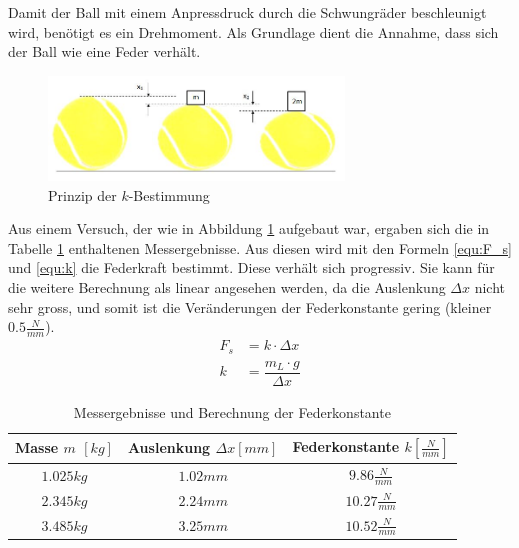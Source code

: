 Damit der Ball mit einem Anpressdruck durch die Schwungräder beschleunigt 
wird, benötigt es ein Drehmoment. Als Grundlage dient die Annahme, dass sich der 
Ball wie eine Feder verhält.

\begin{figure}[h!]
    \centering
    \includegraphics[width=0.7\textwidth]
    {Enddokumentation/Anhang/Bilder/KompressionBaelle.jpg}
    \caption{Prinzip der $k$-Bestimmung}
    \label{fig:BallKomp}
\end{figure}

Aus einem Versuch, der wie in Abbildung \ref{fig:BallKomp} aufgebaut war, ergaben sich die in Tabelle \ref{tab:BallKompErgebnis} enthaltenen Messergebnisse. Aus diesen wird mit den Formeln \ref{equ:F_s} und \ref{equ:k} die Federkraft bestimmt. Diese verhält sich progressiv. Sie kann für die weitere Berechnung als linear angesehen werden, da die Auslenkung $\Delta x$ nicht sehr gross, und somit ist die Veränderungen der Federkonstante gering (kleiner $0.5 \frac{N}{mm}$).
\begin{align}  
    F_s &= k \cdot \Delta x 
    \label{equ:F_s}\\
    k &= \dfrac{m_L \cdot g}{\Delta x}
    \label{equ:k}
\end{align}
\begin{table}[h!]
    \begin{tabular}{ccc}
        \rule{0pt}{11pt} Masse $m$ $\left[kg\right]$ & Auslenkung $\Delta x 
        \left[mm\right]$ & Federkonstante $k \left[\frac{N}{mm}\right]$\\
        \hline
        \rule{0pt}{11pt} $1.025 kg$ & $1.02 mm$ & $9.86  \frac{N}{mm}$\\
        \rule{0pt}{11pt} $2.345 kg$ & $2.24 mm$ & $10.27 \frac{N}{mm}$\\
        \rule{0pt}{11pt} $3.485 kg$ & $3.25 mm$ & $10.52 \frac{N}{mm}$\\
    \end{tabular}
    \centering
    \caption{Messergebnisse und Berechnung der Federkonstante}
    \label{tab:BallKompErgebnis}
\end{table}

